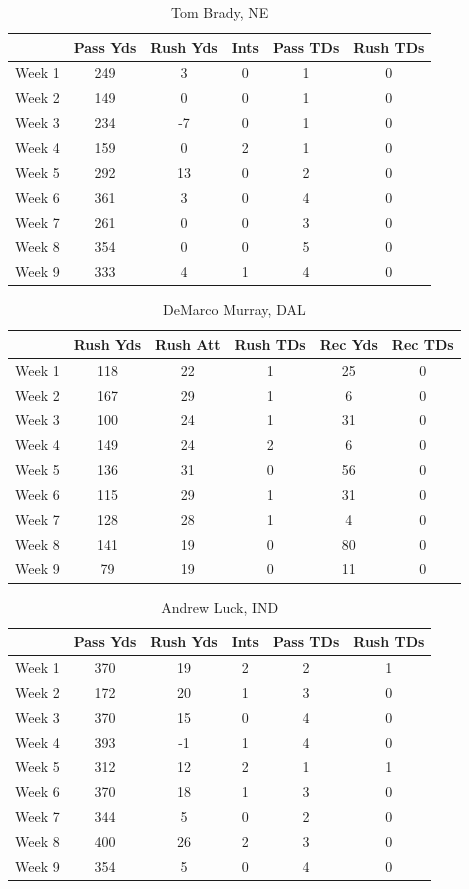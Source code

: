 \documentclass{article}
\begin{document}
    \begin{table}[h,t]
        \caption{ Tom Brady, NE }
        \begin{tabular}{ l|ccccc }
            \hline
 & Pass Yds & Rush Yds & Ints & Pass TDs & Rush TDs\\
            \hline \hline
Week 1 & 249 & 3 & 0 & 1 & 0\\
Week 2 & 149 & 0 & 0 & 1 & 0\\
Week 3 & 234 & -7 & 0 & 1 & 0\\
Week 4 & 159 & 0 & 2 & 1 & 0\\
Week 5 & 292 & 13 & 0 & 2 & 0\\
Week 6 & 361 & 3 & 0 & 4 & 0\\
Week 7 & 261 & 0 & 0 & 3 & 0\\
Week 8 & 354 & 0 & 0 & 5 & 0\\
Week 9 & 333 & 4 & 1 & 4 & 0\\
        \end{tabular}
    \end{table}
    \begin{table}[h,t]
        \caption{ DeMarco Murray, DAL }
        \begin{tabular}{ l|ccccc }
            \hline
 & Rush Yds & Rush Att & Rush TDs & Rec Yds & Rec TDs\\
            \hline \hline
Week 1 & 118 & 22 & 1 & 25 & 0\\
Week 2 & 167 & 29 & 1 & 6 & 0\\
Week 3 & 100 & 24 & 1 & 31 & 0\\
Week 4 & 149 & 24 & 2 & 6 & 0\\
Week 5 & 136 & 31 & 0 & 56 & 0\\
Week 6 & 115 & 29 & 1 & 31 & 0\\
Week 7 & 128 & 28 & 1 & 4 & 0\\
Week 8 & 141 & 19 & 0 & 80 & 0\\
Week 9 & 79 & 19 & 0 & 11 & 0\\
        \end{tabular}
    \end{table}
    \begin{table}[h,t]
        \caption{ Andrew Luck, IND }
        \begin{tabular}{ l|ccccc }
            \hline
 & Pass Yds & Rush Yds & Ints & Pass TDs & Rush TDs\\
            \hline \hline
Week 1 & 370 & 19 & 2 & 2 & 1\\
Week 2 & 172 & 20 & 1 & 3 & 0\\
Week 3 & 370 & 15 & 0 & 4 & 0\\
Week 4 & 393 & -1 & 1 & 4 & 0\\
Week 5 & 312 & 12 & 2 & 1 & 1\\
Week 6 & 370 & 18 & 1 & 3 & 0\\
Week 7 & 344 & 5 & 0 & 2 & 0\\
Week 8 & 400 & 26 & 2 & 3 & 0\\
Week 9 & 354 & 5 & 0 & 4 & 0\\
        \end{tabular}
    \end{table}
\end{document}
